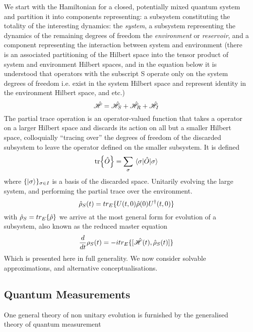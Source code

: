 We start with the Hamiltonian for a closed, potentially mixed quantum system and partition it into components representing: a subsystem constituting the totality of the interesting dynamics: the \emph{system}, a subsystem representing the dynamics of the remaining degrees of freedom the \emph{environment} or \emph{reservoir}, and a component representing the interaction between system and environment (there is an associated partitioning of the Hilbert space into the tensor product of system and environment Hilbert spaces, and in the equation below it is understood that operators with the subscript S operate only on the system degrees of freedom i.e. exist in the system Hilbert space and represent identity in the environment Hilbert space, and etc.)
\begin{equation}
	\hat{\mathscr{H}} = \hat{\mathscr{H}}_S +\hat{\mathscr{H}}_R + \hat{\mathscr{H}}_I
\end{equation}
The partial trace operation is an operator-valued function that takes a operator on a larger Hilbert space and discards its action on all but a smaller Hilbert space, colloquially ``tracing over'' the degrees of freedom of the discarded subsystem to leave the operator defined on the smaller subsystem.
It is defined 
\begin{equation}
  \tr{\hat{O}} = \sum_\sigma\ev{\hat{O}}{\sigma}
  \label{trace}
\end{equation}
where $\{\ket{\sigma}\}_{\sigma \in I}$ is a basis of the discarded space.
Unitarily evolving the large system, and performing the partial trace over the environment.
\begin{equation}
	\hat{\rho}_S (t) = tr_E \{U(t, 0) \hat{\rho} (0) U^\dagger (t, 0) \}
\end{equation}
with $\hat{\rho}_S = tr_E\{\hat{\rho} \}$ we arrive at the most general form for evolution of a subsystem, also known as the reduced master equation
\begin{equation}
	\frac{d}{dt} \rho_S (t) = -itr_E\{[\hat{\mathscr{H}}(t), \hat{\rho}_S(t)]\}
        \label{general}
\end{equation}
Which is presented here in full generality. We now consider solvable approximations, and alternative conceptualisations.
\subsection{Quantum Measurements}
One general theory of non unitary evolution is furnished by the generalised theory of quantum measurement \cite{Wiseman2010a}
